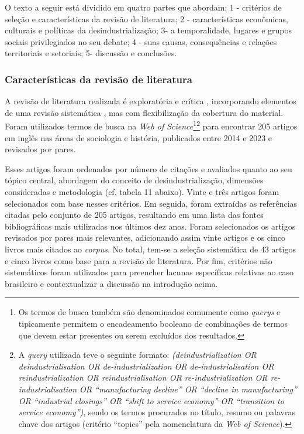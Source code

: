 O texto a seguir está dividido em quatro partes que abordam: 1 -
critérios de seleção e características da revisão de literatura; 2 -
características econômicas, culturais e políticas da
desindustrialização; 3- a temporalidade, lugares e grupos sociais
privilegiados no seu debate; 4 - suas causas, consequências e relações
territoriais e setoriais; 5- discussão e conclusões.

\subsubsection{Características da revisão de literatura}

A revisão de literatura realizada é exploratória e crítica
\citep[p.~15]{jesson_doing_2011}, incorporando elementos de uma revisão sistemática
\citep[p.~25]{efron_writing_2019}, mas com flexibilização da cobertura do material. Foram
utilizados termos de busca na \emph{Web of
Science}\footnote{Os termos de busca também são denominados comumente
  como \emph{querys} e tipicamente permitem o encadeamento booleano de
  combinações de termos que devem estar presentes ou serem excluídos dos
  resultados.}\footnote{A \emph{query} utilizada teve o seguinte
  formato: \emph{(deindustrialization OR deindustrialisation OR
  de-industrialization OR de-industrialisation OR reindustrialization OR
  reindustrialisation OR re-industrialization OR re-industrialisation OR
  ``manufacturing decline'' OR ``decline in manufacturing'' OR
  ``industrial closings'' OR ``shift to service economy'' OR
  ``transition to service economy'')}, sendo os termos procurados no
  título, resumo ou palavras chave dos artigos (critério ``topics'' pela
  nomenclatura da \emph{Web of Science}).} para encontrar 205 artigos em
inglês nas áreas de sociologia e história, publicados entre 2014 e 2023
e revisados por pares.

Esses artigos foram ordenados por número de citações e avaliados quanto
ao seu tópico central, abordagem do conceito de desindustrialização,
dimensões consideradas e metodologia (cf. tabela 11 abaixo). Vinte e
três artigos foram selecionados com base nesses critérios. Em seguida,
foram extraídas as referências citadas pelo conjunto de 205 artigos,
resultando em uma lista das fontes bibliográficas mais utilizadas nos
últimos dez anos. Foram selecionados os artigos revisados por pares mais
relevantes, adicionando assim vinte artigos e os cinco livros mais
citados ao \emph{corpus}. No total, tem-se a seleção sistemática de 43
artigos e cinco livros como base para a revisão de literatura. Por fim,
critérios não sistemáticos foram utilizados para preencher lacunas
específicas relativas ao caso brasileiro e contextualizar a discussão na
introdução acima.


